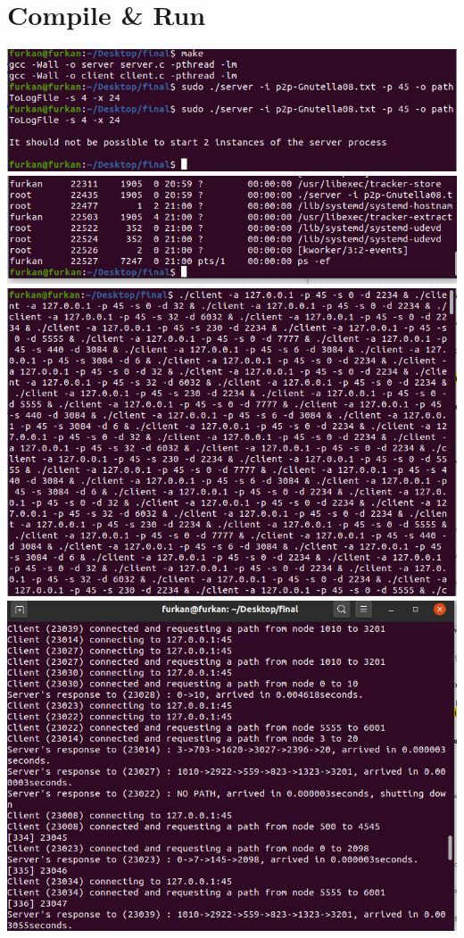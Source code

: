 \documentclass{article}
\begin{document}
\section{Compile \& Run}
\includegraphics[width=\textwidth]{1.png} \newline
\includegraphics[width=\textwidth]{2.png} \newline
\includegraphics[width=\textwidth]{3.png} \newline
\includegraphics[width=\textwidth]{4.png} \newline
\end{document}
